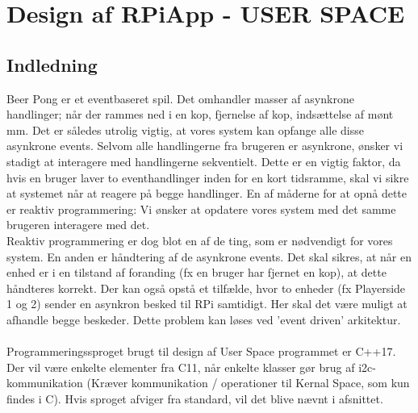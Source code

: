 \documentclass[Softwaredesign/Softwaredesign_main.tex]{subfiles}
\begin{document}
\section{Design af RPiApp - USER SPACE}
\subsection{Indledning}
Beer Pong er et eventbaseret spil. Det omhandler masser af asynkrone handlinger; når der rammes ned i en kop, fjernelse af kop,  indsættelse af mønt mm. Det er således utrolig vigtig, at vores system kan opfange alle disse asynkrone events. Selvom alle handlingerne fra brugeren er asynkrone, ønsker vi stadigt at interagere med handlingerne sekventielt. Dette er en vigtig faktor, da hvis en bruger laver to eventhandlinger inden for en kort tidsramme, skal vi sikre at systemet når at reagere på begge handlinger. En af måderne for at opnå dette er reaktiv programmering: Vi ønsker at opdatere vores system med det samme brugeren interagere med det. 
\\Reaktiv programmering er dog blot en af de ting, som er nødvendigt for vores system. En anden er håndtering af de asynkrone events. Det skal sikres, at når en enhed er i en tilstand af foranding (fx en bruger har fjernet en kop), at dette håndteres korrekt. Der kan også opstå et tilfælde, hvor to enheder (fx Playerside 1 og 2) sender en asynkron besked til RPi samtidigt. Her skal det være muligt at afhandle begge beskeder. Dette problem kan løses ved 'event driven' arkitektur. \\\\
Programmeringssproget brugt til design af User Space programmet er C++17. Der vil være enkelte elementer fra C11, når enkelte klasser gør brug af i2c-kommunikation (Kræver kommunikation / operationer til Kernal Space, som kun findes i C). Hvis sproget afviger fra standard, vil det blive nævnt i afsnittet. 
\end{document}
